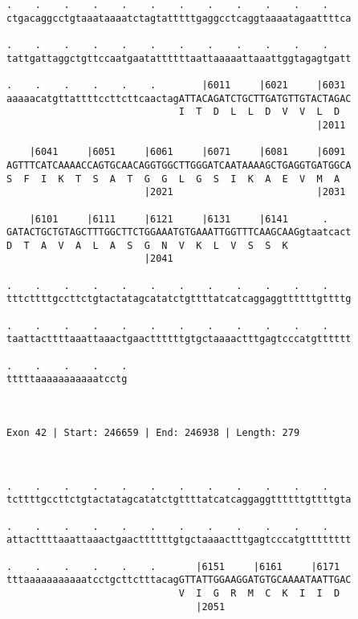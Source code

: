 \documentclass{article}
\begin{document}
\begin{Verbatim}
.    .    .    .    .    .    .    .    .    .    .    .    
ctgacaggcctgtaaataaaatctagtatttttgaggcctcaggtaaaatagaattttca
                                                            
.    .    .    .    .    .    .    .    .    .    .    .    
tattgattaggctgttccaatgaatattttttaattaaaaattaaattggtagagtgatt
                                                            
.    .    .    .    .    .        |6011     |6021     |6031 
aaaaacatgttattttccttcttcaactagATTACAGATCTGCTTGATGTTGTACTAGAC
                              I  T  D  L  L  D  V  V  L  D  
                                                      |2011 
  
    |6041     |6051     |6061     |6071     |6081     |6091 
AGTTTCATCAAAACCAGTGCAACAGGTGGCTTGGGATCAATAAAAGCTGAGGTGATGGCA
S  F  I  K  T  S  A  T  G  G  L  G  S  I  K  A  E  V  M  A  
                        |2021                         |2031 
  
    |6101     |6111     |6121     |6131     |6141      .    
GATACTGCTGTAGCTTTGGCTTCTGGAAATGTGAAATTGGTTTCAAGCAAGgtaatcact
D  T  A  V  A  L  A  S  G  N  V  K  L  V  S  S  K           
                        |2041                               
  
.    .    .    .    .    .    .    .    .    .    .    .    
tttcttttgccttctgtactatagcatatctgttttatcatcaggaggttttttgttttg
                                                            
.    .    .    .    .    .    .    .    .    .    .    .    
taattacttttaaattaaactgaacttttttgtgctaaaactttgagtcccatgtttttt
                                                            
.    .    .    .    .
tttttaaaaaaaaaaatcctg
                     
                     
 
Exon 42 | Start: 246659 | End: 246938 | Length: 279



.    .    .    .    .    .    .    .    .    .    .    .    
tcttttgccttctgtactatagcatatctgttttatcatcaggaggttttttgttttgta
                                                            
.    .    .    .    .    .    .    .    .    .    .    .    
attacttttaaattaaactgaacttttttgtgctaaaactttgagtcccatgtttttttt
                                                            
.    .    .    .    .    .       |6151     |6161     |6171  
tttaaaaaaaaaaatcctgcttctttacagGTTATTGGAAGGATGTGCAAAATAATTGAC
                              V  I  G  R  M  C  K  I  I  D  
                                 |2051                      
  

\end{Verbatim}
\end{document}
